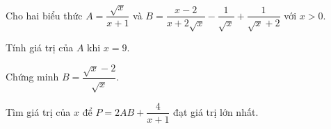 \documentclass[12pt]{article}
\begin{document}
\begin{bt}
Cho hai biểu thức $A = \dfrac{\sqrt{x}}{x+1}$ và $B = \dfrac{x-2}{x+2\sqrt{x}} - \dfrac{1}{\sqrt{x}} + \dfrac{1}{\sqrt{x}+2}$ với $x > 0$.
\begin{cacy}
\item Tính giá trị của $A$ khi $x = 9$.
\item Chứng minh $B = \dfrac{\sqrt{x}-2}{\sqrt{x}}$.
\item Tìm giá trị của $x$ để $P = 2AB + \dfrac{4}{x+1}$ đạt giá trị lớn nhất.
\end{cacy}
\loigiai{}
\end{bt}

\end{document}
